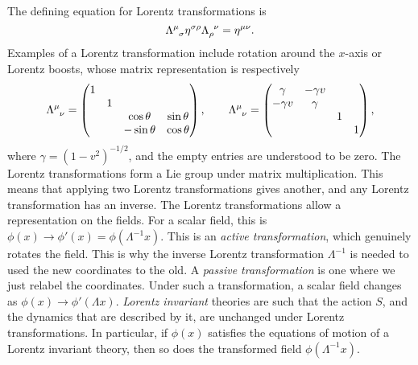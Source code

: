 The defining equation for Lorentz transformations is
\begin{equation}
  \Lambda\indices{^\mu_\sigma}\eta\indices{^\sigma^\rho} \Lambda\indices{_\rho ^\nu} = \eta\indices{^\mu^\nu}.
\end{equation}
Examples of a Lorentz transformation include rotation around the $x$-axis or Lorentz boosts, whose matrix representation is respectively
\begin{equation}
  \Lambda\indices{^\mu_\nu} = 
  \begin{pmatrix}
   1 &  &  &  \\
    & 1 &  &  \\
    &  & \cos\theta & \sin\theta \\
    &  & -\sin\theta & \cos\theta \\
  \end{pmatrix},
  \qquad
  \Lambda\indices{^\mu_\nu} = 
  \begin{pmatrix}
   \gamma & -\gamma v &  &  \\
   -\gamma v & \gamma &  &  \\
    &  & 1 &  \\
    &  &  & 1 \\
  \end{pmatrix},
\end{equation}
where $\gamma = (1- v^2)^{-1/2}$, and the empty entries are understood to be zero.
The Lorentz transformations form a Lie group under matrix multiplication. This means that applying two Lorentz transformations gives another, and any Lorentz transformation has an inverse.
The Lorentz transformations allow a representation on the fields.
For a scalar field, this is $\phi(x) \to \phi'(x) = \phi(\Lambda^{-1} x)$. This is an \emph{active transformation}, which genuinely rotates the field. This is why the inverse Lorentz transformation $\Lambda^{-1}$ is needed to used the new coordinates to the old.
A \emph{passive transformation} is one where we just relabel the coordinates. Under such a transformation, a scalar field changes as $\phi(x) \to \phi'(\Lambda x)$.
\emph{Lorentz invariant} theories are such that the action $S$, and the dynamics that are described by it, are unchanged under Lorentz transformations.
In particular, if $\phi(x)$ satisfies the equations of motion of a Lorentz invariant theory, then so does the transformed field $\phi(\Lambda^{-1} x)$.

